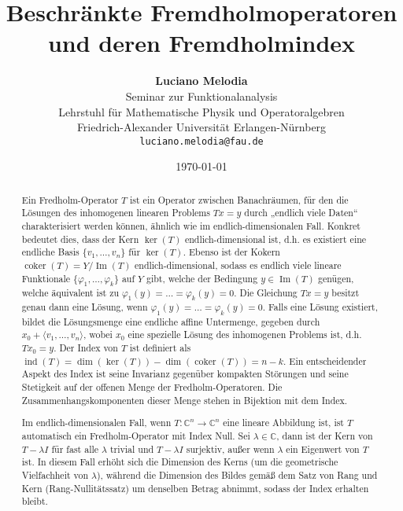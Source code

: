 \documentclass[11pt, hidelinks]{article}
\title{\textbf{Beschränkte Fremdholmoperatoren und deren Fremdholmindex}}
\author{
\textbf{Luciano Melodia} \\
Seminar zur Funktionalanalysis \\
Lehrstuhl für Mathematische Physik und Operatoralgebren \\
Friedrich-Alexander Universität Erlangen-Nürnberg \\
\texttt{luciano.melodia@fau.de}}
\date{\today}
\numberwithin{conj}{section}
\begin{document}
\hypersetup{bookmarksnumbered=true}
\maketitle

\begin{abstract}
Ein Fredholm-Operator \(T\) ist ein Operator zwischen Banachräumen, für den die Lösungen des inhomogenen linearen Problems \(T x = y\) durch „endlich viele Daten“ charakterisiert werden können, ähnlich wie im endlich-dimensionalen Fall. Konkret bedeutet dies, dass der Kern \(\ker(T)\) endlich-dimensional ist, d.h. es existiert eine endliche Basis \(\{v_1, \dots, v_n\}\) für \(\ker(T)\). Ebenso ist der Kokern \(\operatorname{coker}(T) = Y / \operatorname{Im}(T)\) endlich-dimensional, sodass es endlich viele lineare Funktionale \(\{\varphi_1, \dots, \varphi_k\}\) auf \(Y\) gibt, welche der Bedingung \(y \in \operatorname{Im}(T)\) genügen, welche äquivalent ist zu \(\varphi_1(y) = \dots = \varphi_k(y) = 0\). Die Gleichung \(T x = y\) besitzt genau dann eine Lösung, wenn \(\varphi_1(y) = \dots = \varphi_k(y) = 0\). Falls eine Lösung existiert, bildet die Lösungsmenge eine endliche affine Untermenge, gegeben durch \(x_0 + \langle v_1, \dots, v_n \rangle\), wobei \(x_0\) eine spezielle Lösung des inhomogenen Problems ist, d.h. \(T x_0 = y\). Der Index von \(T\) ist definiert als \(\operatorname{ind}(T) = \dim(\ker(T)) - \dim(\operatorname{coker}(T)) = n - k\). Ein entscheidender Aspekt des Index ist seine Invarianz gegenüber kompakten Störungen und seine Stetigkeit auf der offenen Menge der Fredholm-Operatoren. Die Zusammenhangskomponenten dieser Menge stehen in Bijektion mit dem Index.

Im endlich-dimensionalen Fall, wenn \(T: \mathbb{C}^n \to \mathbb{C}^n\) eine lineare Abbildung ist, ist \(T\) automatisch ein Fredholm-Operator mit Index Null. Sei \(\lambda \in \mathbb{C}\), dann ist der Kern von \(T - \lambda I\) für fast alle \(\lambda\) trivial und \(T - \lambda I\) surjektiv, außer wenn \(\lambda\) ein Eigenwert von \(T\) ist. In diesem Fall erhöht sich die Dimension des Kerns (um die geometrische Vielfachheit von \(\lambda\)), während die Dimension des Bildes gemäß dem Satz von Rang und Kern (Rang-Nullitätssatz) um denselben Betrag abnimmt, sodass der Index erhalten bleibt.


\end{abstract}
\end{document}
